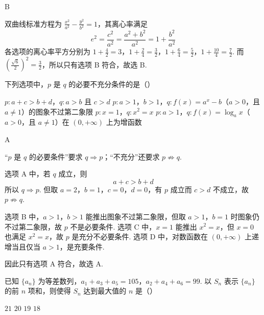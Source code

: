 \begin{answer}
B
\end{answer}

\begin{solution}
双曲线标准方程为 \(\frac{x^2}{a^2}-\frac{y^2}{b^2}=1\)，其离心率满足
\[
e^2=\frac{c^2}{a^2}=\frac{a^2+b^2}{a^2}=1+\frac{b^2}{a^2}
\]
各选项的离心率平方分别为
\(1+\frac{4}{2}=3\)，\(1+\frac{2}{4}=\frac{3}{2}\)，\(1+\frac{6}{4}=\frac{5}{2}\)，\(1+\frac{10}{4}=\frac{7}{2}\).
而 \(\left(\frac{\sqrt{6}}{2}\right)^2=\frac{3}{2}\)，所以只有选项 B 符合，故选 B.
\end{solution}

\begin{problem}
下列选项中，\(p\) 是 \(q\) 的必要不充分条件的是（\quad）

\choices
    {\(p: a + c > b + d\)，\(q: a > b\) 且 \(c > d\)}
    {\(p: a > 1\)，\(b > 1\)，\(q: f(x) = a^x - b\)（\(a > 0\)，且 \(a \neq 1\)）的图象不过第二象限}
    {\(p: x = 1\)，\(q: x^2 = x\)}
    {\(p: a > 1\)，\(q: f(x) = \log_a x\)（\(a > 0\)，且 \(a \neq 1\)）在 \((0, +\infty)\) 上为增函数}
\end{problem}

\begin{answer}
A
\end{answer}

\begin{solution}
“\(p\) 是 \(q\) 的必要条件”要求 \(q\Rightarrow p\)；“不充分”还要求 \(p\not\Rightarrow q\).

选项 A 中，若 \(q\) 成立，则
\[
a+c>b+d
\]
所以 \(q\Rightarrow p\). 但取 \(a=2\)，\(b=1\)，\(c=0\)，\(d=0\)，有 \(p\) 成立而 \(c>d\) 不成立，故 \(p\not\Rightarrow q\).

选项 B 中，\(a>1\)，\(b>1\) 能推出图象不过第二象限，但取 \(a>1\)，\(b=1\) 时图象仍不过第二象限，故 \(p\) 不是必要条件. 选项 C 中，\(x=1\) 能推出 \(x^2=x\)，但 \(x=0\) 也满足 \(x^2=x\)，故 \(p\) 是充分不必要条件. 选项 D 中，对数函数在 \((0,+\infty)\) 上递增当且仅当 \(a>1\)，是充要条件.

因此只有选项 A 符合，故选 A.
\end{solution}

\begin{problem}
已知 \(\{a_n\}\) 为等差数列，\(a_1 + a_3 + a_5 = 105\)，\(a_2 + a_4 + a_6 = 99\). 以 \(S_n\) 表示 \(\{a_n\}\) 的前 \(n\) 项和，则使得 \(S_n\) 达到最大值的 \(n\) 是（\quad）

\choices
    {\(21\)}
    {\(20\)}
    {\(19\)}
    {\(18\)}
\end{problem}

